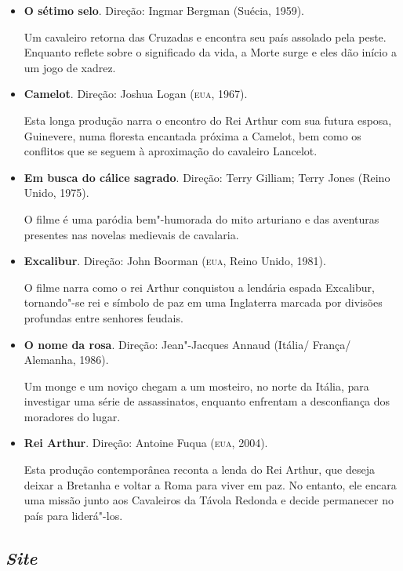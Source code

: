 \documentclass{extarticle}
\begin{document}
\begin{itemize}
\item\textbf{O sétimo selo}. Direção: Ingmar Bergman (Suécia, 1959).

  Um cavaleiro retorna das Cruzadas e encontra seu país assolado pela
  peste. Enquanto reflete sobre o significado da vida, a Morte surge e
  eles dão início a um jogo de xadrez.

\item\textbf{Camelot}. Direção: Joshua Logan (\textsc{eua}, 1967).

  Esta longa produção narra o encontro do Rei Arthur com sua futura
  esposa, Guinevere, numa floresta encantada próxima a Camelot, bem como
  os conflitos que se seguem à aproximação do cavaleiro Lancelot.

\item\textbf{Em busca do cálice sagrado}. Direção: Terry Gilliam; ‎Terry
Jones (Reino Unido, 1975).

  O filme é uma paródia bem"-humorada do mito arturiano e das aventuras
  presentes nas novelas medievais de cavalaria.

\item\textbf{Excalibur}. Direção: John Boorman (\textsc{eua}, Reino Unido, 1981).

  O filme narra como o rei Arthur conquistou a lendária espada
  Excalibur, tornando"-se rei e símbolo de paz em uma Inglaterra marcada
  por divisões profundas entre senhores feudais.

\item\textbf{O nome da rosa}. Direção: Jean"-Jacques Annaud (Itália/ França/
Alemanha, 1986).

  Um monge e um noviço chegam a um mosteiro, no norte da Itália, para
  investigar uma série de assassinatos, enquanto enfrentam a
  desconfiança dos moradores do lugar.

\item\textbf{Rei Arthur}. Direção: Antoine Fuqua (\textsc{eua}, 2004).

  Esta produção contemporânea reconta a lenda do Rei Arthur, que deseja
  deixar a Bretanha e voltar a Roma para viver em paz. No entanto, ele
  encara uma missão junto aos Cavaleiros da Távola Redonda e decide
  permanecer no país para liderá"-los.
\end{itemize}

\subsection{\emph{Site}}
\end{document}
